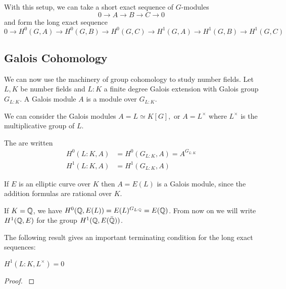 \documentclass[12pt, a4paper]{amsart}
\begin{document}
\begin{prop}
  With this setup, we can take a short exact sequence of $G$-modules
  \[ 0 \rightarrow A \rightarrow B \rightarrow C \rightarrow 0\]
  and form the long exact sequence
  \[ 0 \rightarrow H^0(G, A) \rightarrow H^0(G,B) \rightarrow H^0(G,C)
    \rightarrow H^1(G, A) \rightarrow H^1(G,B) \rightarrow H^1(G,C) \]
\end{prop}

\subsection{Galois Cohomology}

We can now use the machinery of group cohomology to study number fields.
Let $L, K$ be number fields and $L : K$ a finite degree Galois
extension with Galois group $G_{L:K}$.
A Galois module $A$ is a module over $G_{L:K}$.

\begin{example}
  We can consider the Galois modules $A = L \simeq K[G], $ or $A =
  L^{\times}$ where $L^{\times}$ is the multiplicative group of $L$.
\end{example}


\begin{defn}
  The  are written
  \begin{equation*}
    \begin{split}
      H^0(L:K, A) &= H^0(G_{L:K}, A) = A^{G_{L:K}} \\
      H^1(L:K, A) &= H^1(G_{L:K}, A)
     \end{split}
   \end{equation*}
\end{defn}

\begin{example}
  If $E$ is an elliptic curve over $K$ then $A = E(L)$ is a Galois module,
  since the addition formulas are rational over $K$.

  If $K = {\mathbb Q}$, we have $H^0({\mathbb Q},E(L)) = E(L)^{G_{L:{\mathbb Q}}} = E({\mathbb Q})$.
  From now on we will write $H^1({\mathbb Q}, E)$ for the group $H^1({\mathbb Q}, E(\bar{{\mathbb Q}}))$.
\end{example}

The following result gives an important terminating condition for the
long exact sequences:

\begin{thm}
  $  H^1(L : K, L^{\times}) = 0$
\end{thm}
\begin{proof}
  \cite[See][Chapter X, page 150]{cohomology}
\end{proof}
\end{document}
